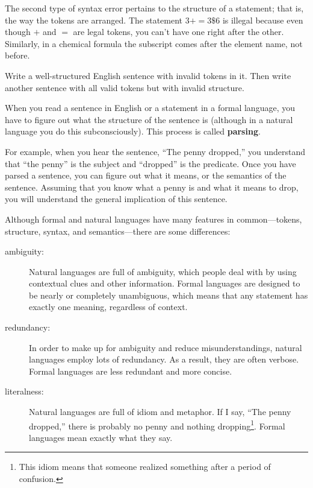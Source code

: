 \documentclass[10pt]{book}
\begin{document}

The second type of syntax error pertains to the structure of a
statement; that is, the way the tokens are arranged.  The statement $3
+ = 3 \mbox{\$} 6$ is illegal because even though $+$ and $=$ are
legal tokens, you can't have one right after the other.  Similarly,
in a chemical formula the subscript comes after the element name, not
before.

\begin{ex}
Write a well-structured English
sentence with invalid tokens in it.  Then write another sentence
with all valid tokens but with invalid structure.
\end{ex}

When you read a sentence in English or a statement in a formal
language, you have to figure out what the structure of the sentence is
(although in a natural language you do this subconsciously).  This
process is called {\bf parsing}.


For example, when you hear the sentence, ``The penny dropped,'' you
understand that ``the penny'' is the subject and ``dropped'' is the
predicate.  Once you have parsed a sentence, you can figure out what it
means, or the semantics of the sentence.  Assuming that you know
what a penny is and what it means to drop, you will understand the
general implication of this sentence.

Although formal and natural languages have many features in
common---tokens, structure, syntax, and semantics---there are some
differences:


\begin{description}

\item[ambiguity:] Natural languages are full of ambiguity, which
people deal with by using contextual clues and other information.
Formal languages are designed to be nearly or completely unambiguous,
which means that any statement has exactly one meaning,
regardless of context.

\item[redundancy:] In order to make up for ambiguity and reduce
misunderstandings, natural languages employ lots of
redundancy.  As a result, they are often verbose.  Formal languages
are less redundant and more concise.

\item[literalness:] Natural languages are full of idiom and metaphor.
If I say, ``The penny dropped,'' there is probably no penny and
nothing dropping\footnote{This idiom means that someone realized something
after a period of confusion.}.  Formal languages
mean exactly what they say.

\end{description}
\end{document}
